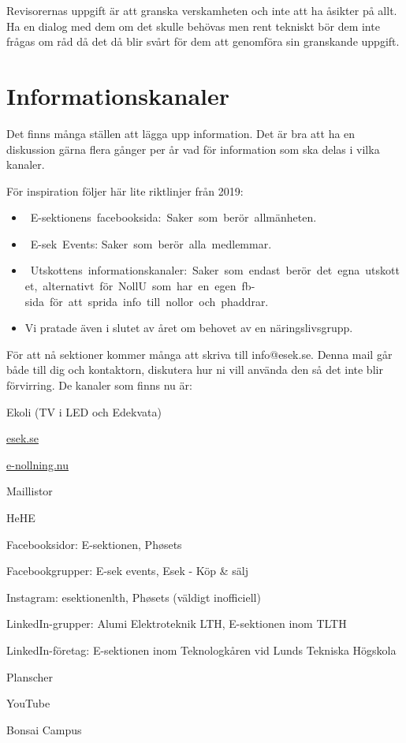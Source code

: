\documentclass[10pt]{article}
\begin{document}
    Revisorernas uppgift är att granska verskamheten och inte att ha åsikter på allt. Ha en dialog med dem om det skulle behövas men rent tekniskt bör dem inte frågas om råd då det då blir svårt för dem att genomföra sin granskande uppgift.
    
    \section{Informationskanaler}
    
    Det finns många ställen att lägga upp information. Det är bra att ha en diskussion gärna flera gånger per år vad för information som ska delas i vilka kanaler. 

    För inspiration följer här lite riktlinjer från 2019:
    
    \begin{itemize}
        \item E-sektionens facebooksida: Saker som berör allmänheten.
        \item E-sek Events: Saker som berör alla medlemmar.
        \item Utskottens informationskanaler: Saker som endast berör det egna utskottet, alternativt för NollU som har en egen fb-sida för att sprida info till nollor och phaddrar.
        \item Vi pratade även i slutet av året om behovet av en näringslivsgrupp. 
    \end{itemize}
    
    För att nå sektioner kommer många att skriva till info@esek.se. Denna mail går både till dig och kontaktorn, diskutera hur ni vill använda den så det inte blir förvirring. De kanaler som finns nu är:
    
    \begin{dashlist}
        \item Ekoli (TV i LED och Edekvata)
        \item \url{esek.se}
        \item \url{e-nollning.nu}
        \item Maillistor
        \item HeHE
        \item Facebooksidor: E-sektionen, Ph\o sets
        \item Facebookgrupper: E-sek events, Esek - Köp \& sälj
        \item Instagram: esektionenlth, Ph\o sets (väldigt inofficiell)
        \item LinkedIn-grupper: Alumi Elektroteknik LTH, E-sektionen inom TLTH
        \item LinkedIn-företag: E-sektionen inom Teknologkåren vid Lunds Tekniska Högskola
        \item Planscher
        \item YouTube
        \item Bonsai Campus
    \end{dashlist}
    
\end{document}
